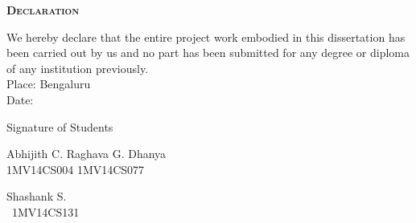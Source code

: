 \begin{titlepage}

\begin{center}
\textbf{\textsc{\LARGE Declaration}}
\end{center}
We hereby declare that the entire project work embodied in this dissertation has been carried out by us and no part has been submitted for any degree or diploma of any institution previously.\bigskip\\

\noindent Place: Bengaluru\\
Date:\\
\begin{center}
Signature of Students
\end{center}
\vspace{100px}

\noindent Abhijith C. \hfill Raghava G. Dhanya \hfill\\
 \noindent 1MV14CS004 \hfill 1MV14CS077 \hspace{37pt}\ \\

\vspace{100px}
\begin{center}
Shashank S.\\
\ 1MV14CS131

\end{center}

\end{titlepage}

